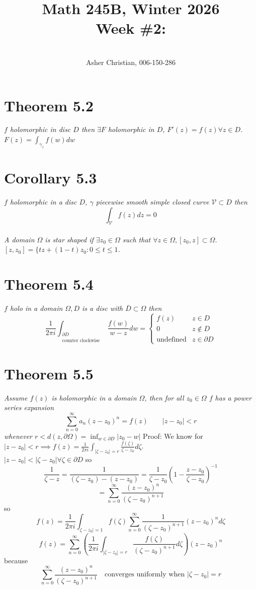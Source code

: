 \documentclass[11pt]{article}
\newcommand{\cnum}{Math 245B}
\newcommand{\ced}{Winter 2026}
\newcommand{\ctitle}[4]{\title{\vspace{-0.5in}\cnum, \ced\\Week #1: #2}\author{\vspace{-0.35in}\\#3, #4}}
\begin{document}
\ctitle{\#2}{}{Asher Christian}{006-150-286}
\date{}
\maketitle
\section{Theorem 5.2}
\emph{
    $f$ holomorphic in disc $D$ then  $\exists F$ holomorphic in  $D$, $F'(z) = f(z) \forall z \in D$.
    $F(z) = \int_{\gamma_z}^{}f(w)dw$
}
\section{Corollary 5.3}
\emph{
    $f$ holomorphic in a disc $D$, $\gamma$ piecewise smooth simple closed curve $\mathcal{V} \subset D$ then
    \[
        \int_{\mathcal{V}}^{}f(z)dz = 0
    \] 
}
\\
\emph{
    A domain $\Omega$ is star shaped if $\exists z_0 \in \Omega$ such that $\forall z \in \Omega, [z_0,z] \subset \Omega$. $[z,z_0] =\{tz+(1-t)z_0 : 0 \le t \le 1$.
}
\section{Theorem 5.4}
\emph{
    $f$ holo in a domain $\Omega, D$ is a disc with  $\overline{ D} \subset \Omega$ then
    \[
        \frac{1}{2\pi i} \int_{\substack{\partial D \\ \text{counter clockwise}}}^{}\frac{f(w)}{w-z}dw =
    \begin{cases}
        f(z) & z \in D\\
        0 & z \not\in D\\
        \text{undefined} & z \in \partial D
    \end{cases}
    \] 
}

\section{Theorem 5.5}
\emph{
    Assume $f(z)$ is holomorphic in a domain  $\Omega$, then for all  $z_0 \in \Omega$ $f$ has a power series expansion
    \[
    \sum_{n=0}^{\infty}a_n(z-z_0)^{n} = f(z) \qquad |z-z_0| < r
    \] 
    whenever $r < d(z,\partial \Omega) = \inf_{w \in \partial D} |z_0 - w|$
}
Proof: We know for $|z-z_0| < r \implies f(z) = \frac{1}{2\pi i} \int_{|\zeta - z_0| = r}^{}\frac{f(\zeta)}{\zeta - z_0} d \zeta$.
\\$|z-z_0| < |\zeta - z_0| \forall \zeta \in \partial D$ so
\[
\frac{1}{\zeta - z} = \frac{1}{(\zeta - z_0) - (z-z_0)} = \frac{1}{\zeta - z_0}(1 - \frac{z-z_0}{\zeta - z_0})^{-1}
\] 
\[
= \sum_{n=0}^{\infty}\frac{(z-z_0)^{n}}{(\zeta - z_0)^{n+1}}
\] 
so
\[
f(z) = \frac{1}{2 \pi i}\int_{\zeta - z_0| = 1}^{}f(\zeta) \sum_{n=0}^{\infty}\frac{1}{(\zeta - z_0)^{n+1}}(z-z_0)^{n}d \zeta
\] 
\[
f(z) = \sum_{n=0}^{\infty}\left(\frac{1}{2\pi i}\int_{|\zeta - z_0| = r}^{} \frac{f(\zeta)}{(\zeta - z_0)^{n+1}}d\zeta\right) (z-z_0)^{n}
\] 
because
\[
    \sum_{n=0}^{\infty}\frac{(z-z_0)^{n}}{(\zeta-z_0)^{n+1}} \quad \text{converges uniformly when $|\zeta-z_0| = r$}
\] 
\end{document}
